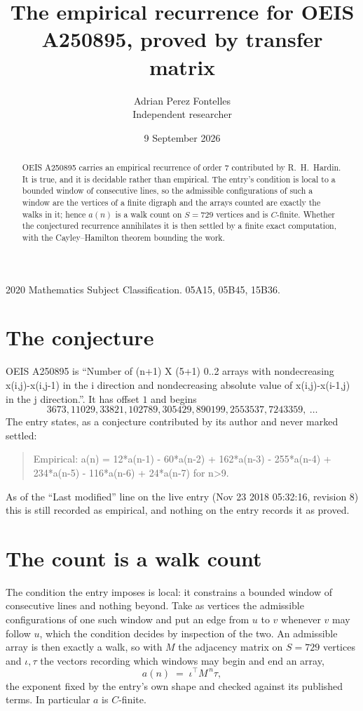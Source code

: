 \documentclass[11pt,a4paper]{article}
\title{The empirical recurrence for OEIS A250895, proved by transfer matrix}
\author{Adrian Perez Fontelles\\ \small Independent researcher}
\date{9 September 2026}
\theoremstyle{plain}
\theoremstyle{definition}
\begin{document}
\maketitle

\begin{abstract}
OEIS A250895 carries an empirical recurrence of order $7$ contributed by R.~H.~Hardin. It is
true, and it is decidable rather than empirical. The entry's condition is local to a bounded window of consecutive lines, so
the admissible configurations of such a window are the vertices of a finite digraph and the
arrays counted are exactly the walks in it; hence $a(n)$ is a walk count on $S=729$ vertices
and is $C$-finite. Whether the conjectured recurrence annihilates it is then settled by a
finite exact computation, with the Cayley--Hamilton theorem bounding the work.
\end{abstract}

\noindent\small 2020 Mathematics Subject Classification. 05A15, 05B45, 15B36.\normalsize

\section{The conjecture}

OEIS A250895 is ``Number of (n+1) X (5+1) 0..2 arrays with nondecreasing x(i,j)-x(i,j-1) in the i direction and nondecreasing absolute value of x(i,j)-x(i-1,j) in the j direction.''. It has offset $1$ and begins
\[
3673, 11029, 33821, 102789, 305429, 890199, 2553537, 7243359,\ \dots
\]
The entry states, as a conjecture contributed by its author and never marked settled:
\begin{quote}
Empirical: a(n) = 12*a(n-1) - 60*a(n-2) + 162*a(n-3) - 255*a(n-4) + 234*a(n-5) - 116*a(n-6) + 24*a(n-7) for n>9.
\end{quote}
As of the ``Last modified'' line on the live entry (Nov 23 2018 05:32:16, revision 8) this is still
recorded as empirical, and nothing on the entry records it as proved.

\section{The count is a walk count}

The condition the entry imposes is local: it constrains a bounded window of consecutive lines and nothing beyond. Take as
vertices the admissible configurations of one such window and put an edge from $u$ to $v$
whenever $v$ may follow $u$, which the condition decides by inspection of the two. An
admissible array is then exactly a walk, so with $M$ the adjacency matrix on $S=729$ vertices
and $\iota,\tau$ the vectors recording which windows may begin and end an array,
\[
a(n)\;=\;\iota^{\!\top}M^{\,n}\tau ,
\]
the exponent fixed by the entry's own shape and checked against its published terms. In
particular $a$ is $C$-finite.
\end{document}
